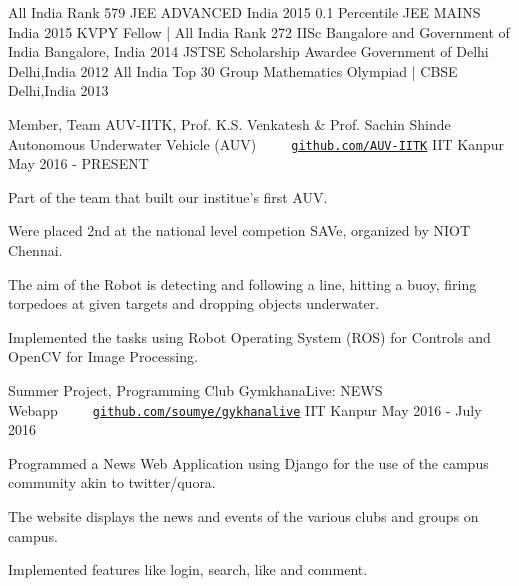 \documentclass[12pt, a4paper]{awesome-cv}
\begin{document}
{\fontsize{11pt}{1em}\bodyfontlight\upshape\color{text}
\begin{cvhonors}
  \cvhonor
    {All India Rank 579}
    {JEE ADVANCED}
    {India}
    {2015}
  \cvhonor
    {0.1 Percentile}
    {JEE MAINS}
    {India}
    {2015}
  \cvhonor
    {KVPY Fellow | All India Rank 272}
    {IISc Bangalore and Government of India}
    {Bangalore, India}
    {2014}
  \cvhonor
    {JSTSE Scholarship Awardee}
    {Government of Delhi}
    {Delhi,India}
    {2012}
  \cvhonor
    {All India Top 30 }
    {Group Mathematics Olympiad | CBSE}    
    {Delhi,India}
    {2013}
\end{cvhonors}
\begin{cventries}
  \cventry
    {Member, Team AUV-IITK, Prof. K.S. Venkatesh \& Prof. Sachin Shinde}
    {Autonomous Underwater Vehicle (AUV)\ \ \ \ \ \texttt{\href{https://github.com/AUV-IITK}{github.com/AUV-IITK}}}
    {IIT Kanpur}
    {May 2016 - PRESENT}
    {
      \begin{cvitems}
        \item {Part of the team that built our institue's first AUV. }
        \item {Were placed 2nd at the national level competion SAVe, organized by NIOT Chennai.}
        \item {The aim of the Robot is detecting and following a line, hitting a buoy, firing torpedoes at given targets and dropping objects underwater.}
        \item {Implemented the tasks using Robot Operating System (ROS) for Controls and OpenCV for Image Processing.}        
      \end{cvitems}
    }
  \cventry
    {Summer Project, Programming Club}
    {GymkhanaLive: NEWS Webapp\ \ \ \ \  \texttt{\href{https://github.com/soumye/gymkhanalive}{github.com/soumye/gykhanalive}}}
    {IIT Kanpur}	
    {May 2016 - July 2016}
    {
      \begin{cvitems}
    	\item Programmed a News Web Application using Django for the use of the campus community akin to twitter/quora.
    	\item The website displays the news and events of the various clubs and groups on campus.
    	\item Implemented features like login, search, like and comment.
      \end{cvitems}
    }
\end{cventries}

}
\end{document}
